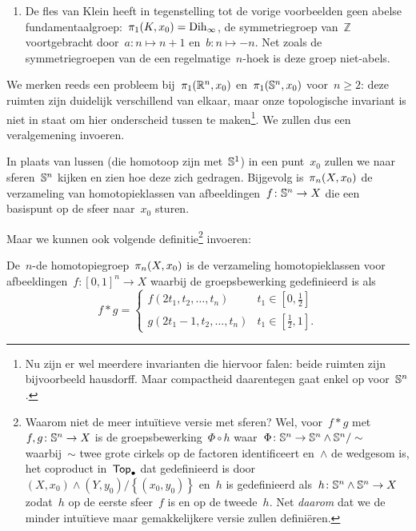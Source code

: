 \documentclass[a4paper,11pt,openany,oneside,article]{memoir}
\begin{document}
\begin{example}
\begin{enumerate}
    \item De fles van Klein heeft in tegenstelling tot de vorige voorbeelden geen abelse fundamentaalgroep:~$\pi_1(K,x_0)=\mathrm{Dih}_{\infty}$, de symmetriegroep van~$\mathbb{Z}$ voortgebracht door~$a\colon n\mapsto n+1$ en~$b\colon n\mapsto -n$. Net zoals de symmetriegroepen van de een regelmatige~$n$\nobreakdash-hoek is deze groep niet-abels. 
  \end{enumerate}
\end{example}

We merken reeds een probleem bij~$\pi_1(\mathbb{R}^n,x_0)$ en~$\pi_1(\mathbb{S}^n,x_0)$ voor~$n\geq 2$: deze ruimten zijn duidelijk verschillend van elkaar, maar onze topologische invariant is niet in staat om hier onderscheid tussen te maken\footnote{Nu zijn er wel meerdere invarianten die hiervoor falen: beide ruimten zijn bijvoorbeeld hausdorff. Maar compactheid daarentegen gaat enkel op voor~$\mathbb{S}^n$.}. We zullen dus een veralgemening invoeren.

In plaats van lussen (die homotoop zijn met~$\mathbb{S}^1$) in een punt~$x_0$ zullen we naar sferen~$\mathbb{S}^n$ kijken en zien hoe deze zich gedragen. Bijgevolg is~$\pi_n(X,x_0)$ de verzameling van homotopieklassen van afbeeldingen~$f\colon\mathbb{S}^n\to X$ die een basispunt op de sfeer naar~$x_0$ sturen.

Maar we kunnen ook volgende definitie\footnote{Waarom niet de meer intu\"itieve versie met sferen? Wel, voor~$f\ast g$ met~$f,g\colon\mathbb{S}^n\to X$ is de groepsbewerking~$\Phi\circ h$ waar~$\Phi\colon\mathbb{S}^n\to\mathbb{S}^n\wedge\mathbb{S}^n/\sim$ waarbij~$\sim$ twee grote cirkels op de factoren identificeert en~$\wedge$ de wedgesom is, het coproduct in~$\mathsf{Top}_{\bullet}$ dat gedefinieerd is door~$(X,x_0)\wedge(Y,y_0)/\left\{ (x_0,y_0) \right\}
$ en~$h$ is gedefinieerd als~$h\colon\mathbb{S}^n\wedge\mathbb{S}^n\to X$ zodat~$h$ op de eerste sfeer~$f$ is en op de tweede~$h$. Net \emph{daarom} dat we de minder intu\"itieve maar gemakkelijkere versie zullen defini\"eren.} invoeren:

\begin{definition}
  De~$n$\nobreakdash-de homotopiegroep~$\pi_n(X,x_0)$ is de verzameling homotopieklassen voor afbeeldingen~$f\colon[0,1]^n\to X$ waarbij de groepsbewerking gedefinieerd is als
  \begin{equation}
    f\ast g=
    \begin{cases}
      f(2t_1,t_2,\ldots,t_n) & t_1\in\left[ 0,\frac{1}{2} \right] \\
      g(2t_1-1,t_2,\ldots,t_n) & t_1\in\left[ \frac{1}{2},1 \right].
    \end{cases}
  \end{equation}
\end{definition}
\end{document}

